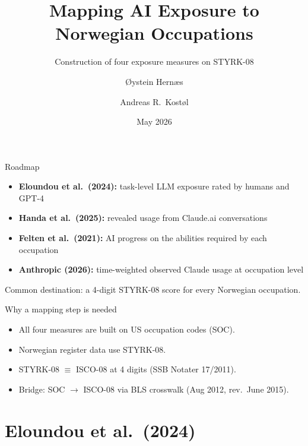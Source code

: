 \documentclass[aspectratio=169,11pt]{beamer}
\title{Mapping AI Exposure to Norwegian Occupations}
\subtitle{Construction of four exposure measures on STYRK-08}
\author{Øystein Hernæs\inst{1} \and Andreas R.\ Kostøl\inst{2}}
\institute{\inst{1}Frisch Centre \and \inst{2}BI Norwegian Business School}
\date{May 2026}
\begin{document}
\maketitle

\begin{frame}{Roadmap}
\begin{itemize}\setlength{\itemsep}{6pt}
  \item \textbf{Eloundou et al.\ (2024):} task-level LLM exposure rated by humans and GPT-4
  \item \textbf{Handa et al.\ (2025):} revealed usage from Claude.ai conversations
  \item \textbf{Felten et al.\ (2021):} AI progress on the abilities required by each occupation
  \item \textbf{Anthropic (2026):} time-weighted observed Claude usage at occupation level
\end{itemize}
\vspace{1em}
Common destination: a 4-digit STYRK-08 score for every Norwegian occupation.
\end{frame}

\begin{frame}{Why a mapping step is needed}
\begin{itemize}\setlength{\itemsep}{8pt}
  \item All four measures are built on US occupation codes (SOC).
  \item Norwegian register data use STYRK-08.
  \item STYRK-08 $\equiv$ ISCO-08 at 4 digits (SSB Notater 17/2011).
  \item Bridge: SOC $\to$ ISCO-08 via BLS crosswalk (Aug 2012, rev.\ June 2015).
\end{itemize}
\end{frame}



\section{Eloundou et al.\ (2024)}





\end{document}
